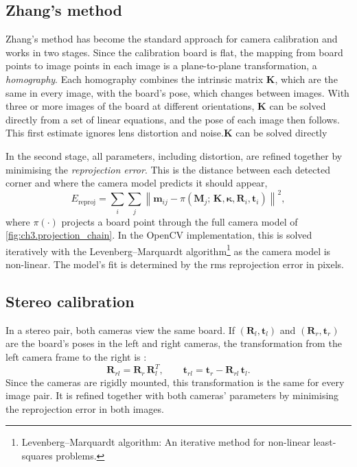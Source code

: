 \subsection{Zhang's method}
\label{subsec:ch3.zhang}
Zhang's method \cite{zhangFlexibleNewTechnique2000} has become the standard approach for camera calibration and works in two stages.
Since the calibration board is flat, the mapping from board points to image points in
 each image is a plane-to-plane transformation, a \textit{homography}.
Each homography combines the intrinsic matrix $\mathbf{K}$, which are the same in every image, with the board's pose, which changes between images.
With three or more images of the board at different orientations, $\mathbf{K}$ can be solved directly from a set of linear equations, and the pose of each image then follows.
This first estimate ignores lens distortion and noise.$\mathbf{K}$ can be solved directly

In the second stage, all parameters, including distortion, are refined together by
 minimising the \textit{reprojection error}. This is the distance between each detected 
 corner and where the camera model predicts it should appear,
\begin{equation}
	E_{\text{reproj}} = \sum_{i}\sum_{j} \left\| \mathbf{m}_{ij} - \pi(\mathbf{M}_j;\, \mathbf{K}, \bm{\kappa}, \mathbf{R}_i, \mathbf{t}_i) \right\|^2 ,
	\label{eq:ch3.reproj}
\end{equation}
where $\pi(\cdot)$ projects a board point through the full camera model of \autoref{fig:ch3.projection_chain}.
In the OpenCV implementation, this is solved iteratively
 with the Levenberg--Marquardt algorithm\footnote{Levenberg--Marquardt algorithm: An iterative method for non-linear least-squares problems.}
 \cite{marquardtAlgorithmLeastSquaresEstimation1963} as the camera model is non-linear. The model's fit is determined
 by the \gls{rms} reprojection error in pixels.
\subsection{Stereo calibration}
\label{subsec:ch3.stereo_calib}
In a stereo pair, both cameras view the same board.
 If $(\mathbf{R}_l, \mathbf{t}_l)$ and $(\mathbf{R}_r, \mathbf{t}_r)$ are 
 the board's poses in the left and right cameras, the transformation 
 from the left camera frame to the right is \cite{opencvCameraCalibration3DLink}:
\begin{equation}
	\mathbf{R}_{rl} = \mathbf{R}_r\,\mathbf{R}_l^T, \qquad \mathbf{t}_{rl} = \mathbf{t}_r - \mathbf{R}_{rl}\,\mathbf{t}_l .
	\label{eq:ch3.stereo_extrinsics}
\end{equation}
Since the cameras are rigidly mounted, this transformation is the same for every image pair.
It is refined together with both cameras' parameters by minimising the
 reprojection error in both images. 


